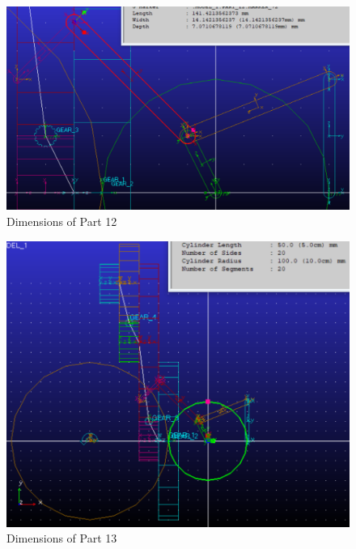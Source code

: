                 \begin{figure}[hbt!]
                    \centering
                    \includegraphics[width=0.9\columnwidth]{Images/dim12.png}
                    \caption{Dimensions of Part 12}
                    \label{fig:dim12}
                \end{figure}

                \begin{figure}[hbt!]
                    \centering
                    \includegraphics[width=0.9\columnwidth]{Images/dim13.png}
                    \caption{Dimensions of Part 13}
                    \label{fig:dim13}
                \end{figure}

